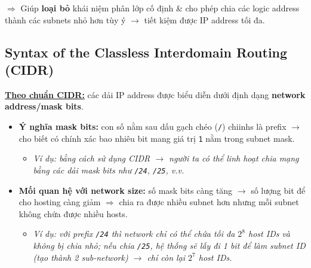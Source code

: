 $\Rightarrow$ Giúp \textbf{loại bỏ} khái niệm phân lớp cố định \& cho phép chia các logic address thành các subnets nhỏ hơn tùy ý $\rightarrow$ tiết kiệm được IP address tối đa.
\medskip

\subsection{Syntax of the Classless Interdomain Routing (CIDR)}

\noindent
\underline{\textbf{Theo chuẩn CIDR:}} các dải IP address được biểu diễn dưới định dạng \textbf{network address/mask bits}.

\begin{itemize}
    \item \textbf{Ý nghĩa mask bits:} con số nằm sau dấu gạch chéo (\texttt{/}) chiinhs là prefix $\rightarrow$ cho biết có chính xác bao nhiêu bit mang giá trị \texttt{1} nằm trong subnet mask. \begin{itemize}
        \item[$\rightarrow$] \textit{Ví dụ: bằng cách sử dụng CIDR $\rightarrow$ người ta có thể linh hoạt chia mạng bằng các dải mask bits như \texttt{/24}, \texttt{/25}, v.v.}
    \end{itemize}
    \item \textbf{Mối quan hệ với network size:} số mask bits càng tăng $\rightarrow$ số lượng bit để cho hosting càng giảm $\Rightarrow$ chia ra được nhiều subnet hơn nhưng mỗi subnet không chứa được nhiều hosts. \begin{itemize}
        \item[$\rightarrow$] \textit{Ví dụ: với prefix \texttt{/24} thì network chỉ có thể chứa tối đa $2^8$ host IDs và không bị chia nhỏ; nếu chia \texttt{/25}, hệ thống sẽ lấy đi 1 bit để làm subnet ID (tạo thành 2 sub-network) $\rightarrow$ chỉ còn lại $2^7$ host IDs.}
    \end{itemize}
\end{itemize}

